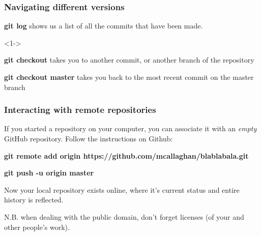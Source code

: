 \documentclass{beamer}
\newcommand{\code}[1]{{\fontfamily{pcr}\selectfont \textbf{#1}}}
\begin{document}
\begin{frame}
	\frametitle{Navigating different versions}
	
	\code{git log} shows us a list of all the commits that have been made.
	
	<1->

\par\noindent\hrulefill\par	

	\code{git checkout} takes you to another commit, or another branch of the repository
	
	\medskip
	
	\code{git checkout master} takes you back to the most recent commit on the master branch
	
	
\end{frame}



%
%
%
%
%

\begin{frame}
\frametitle{Interacting with remote repositories}

If you started a repository on your computer, you can associate it with an \textit{empty} GitHub repository. Follow the instructions on Github: 

\bigskip

\code{git remote add origin https://github.com/mcallaghan/blablabala.git}

\medskip

\code{git push -u origin master }

\bigskip

Now your local repository exists online, where it's current status and entire history is reflected.

\medskip

N.B. when dealing with the public domain, don't forget licenses (of your and other people's work).

\end{frame}
\end{document}
